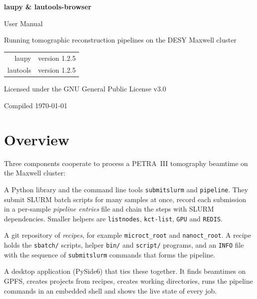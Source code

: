 \documentclass[11pt,a4paper]{article}
\newcommand{\cmd}[1]{\texttt{#1}}
\begin{document}
\begin{titlepage}
  \centering
  \vspace*{3cm}
  {\sffamily\Huge\bfseries\color{accent} laupy \& lautools-browser\par}
  \vspace{0.6cm}
  {\sffamily\LARGE User Manual\par}
  \vspace{1.2cm}
  {\large Running tomographic reconstruction pipelines on the DESY Maxwell cluster\par}
  \vspace{2cm}
  \begin{tabular}{rl}
    laupy & version 1.2.5 \\
    lautools & version 1.2.5 \\
  \end{tabular}
  \vfill
  {\small Licensed under the GNU General Public License v3.0\par}
  {\small Compiled \today\par}
\end{titlepage}

\tableofcontents
\clearpage

\section{Overview}

Three components cooperate to process a PETRA~III tomography beamtime on the Maxwell cluster:

\begin{description}[style=nextline,leftmargin=1.5em]
  \item[laupy] A Python library and the command line tools \cmd{submitslurm} and \cmd{pipeline}.
    They submit SLURM batch scripts for many samples at once, record each submission in a
    per-sample \emph{pipeline entries} file and chain the steps with SLURM dependencies.
    Smaller helpers are \cmd{listnodes}, \cmd{kct-list}, \cmd{GPU} and \cmd{REDIS}.
  \item[laupy-pipelines (the cookbook)] A git repository of \emph{recipes}, for example
    \cmd{microct\_root} and \cmd{nanoct\_root}. A recipe holds the \cmd{sbatch/} scripts, helper
    \cmd{bin/} and \cmd{script/} programs, and an \cmd{INFO} file with the sequence of
    \cmd{submitslurm} commands that forms the pipeline.
  \item[lautools-browser] A desktop application (PySide6) that ties these together. It finds
    beamtimes on GPFS, creates projects from recipes, creates working directories, runs the
    pipeline commands in an embedded shell and shows the live state of every job.
\end{description}
\end{document}
